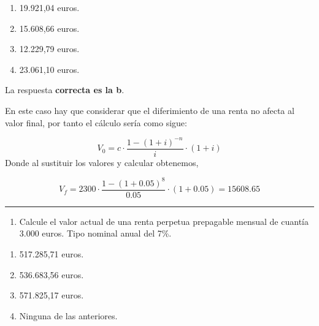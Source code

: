 \documentclass[
  letterpaper,
  DIV=11,
  numbers=noendperiod]{scrreprt}
\providecommand{\tightlist}{%
  \setlength{\itemsep}{0pt}\setlength{\parskip}{0pt}}\usepackage{longtable,booktabs,array}
\begin{document}
\begin{enumerate}
\def\labelenumi{\alph{enumi})}
\item
  19.921,04 euros.
\item
  15.608,66 euros.
\item
  12.229,79 euros.
\item
  23.061,10 euros.
\end{enumerate}

\begin{tcolorbox}[enhanced jigsaw, left=2mm, opacityback=0, colback=white, breakable, arc=.35mm, bottomrule=.15mm, rightrule=.15mm, toprule=.15mm, leftrule=.75mm, colframe=quarto-callout-tip-color-frame]
\begin{minipage}[t]{5.5mm}
\textcolor{quarto-callout-tip-color}{\faLightbulb}
\end{minipage}%
\begin{minipage}[t]{\textwidth - 5.5mm}

La respuesta \textbf{correcta es la b}.

En este caso hay que considerar que el diferimiento de una renta no
afecta al valor final, por tanto el cálculo sería como sigue:

\[V_0=c\cdot\frac{1-\left(1+i\right)^{-n}}{i}\cdot(1+i)\] Donde al
sustituir los valores y calcular obtenemos,

\[V_f=2300\cdot\frac{1-\left(1+0.05\right)^8}{0.05}\cdot(1+0.05)=15608.65\]

\end{minipage}%
\end{tcolorbox}

\begin{center}\rule{0.5\linewidth}{0.5pt}\end{center}

\begin{enumerate}
\def\labelenumi{\arabic{enumi}.}
\setcounter{enumi}{83}
\tightlist
\item
  Calcule el valor actual de una renta perpetua prepagable mensual de
  cuantía 3.000 euros. Tipo nominal anual del 7\%.
\end{enumerate}

\begin{enumerate}
\def\labelenumi{\alph{enumi}.}
\item
  517.285,71 euros.
\item
  536.683,56 euros.
\item
  571.825,17 euros.
\item
  Ninguna de las anteriores.
\end{enumerate}
\end{document}
